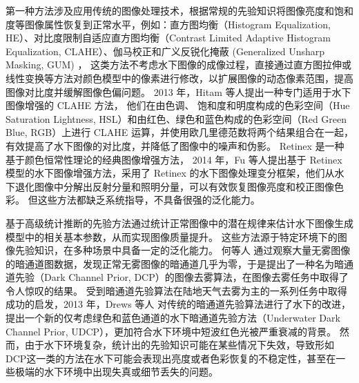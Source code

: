 第一种方法涉及应用传统的图像处理技术，根据常规的先验知识将图像亮度和饱和度等图像属性恢复到正常水平，例如：直方图均衡（Histogram Equalization, HE）\cite{he}、对比度限制自适应直方图均衡（Contrast Limited Adaptive Histogram Equalization, CLAHE）\cite{clahe}、伽马校正和广义反锐化掩蔽 (Generalized Unsharp Masking, GUM) \cite{gum}，
这类方法不考虑水下图像的成像过程，直接通过直方图拉伸或线性变换等方法对颜色模型中的像素进行修改，以扩展图像的动态像素范围，提高图像对比度并缓解图像色偏问题。
2013 年，Hitam 等人\cite{mixture_clahe}提出一种专门适用于水下图像增强的 CLAHE 方法， 他们在由色调、 饱和度和明度构成的色彩空间（Hue Saturation Lightness, HSL）和由红色、绿色和蓝色构成的色彩空间（Red Green Blue, RGB）上进行 CLAHE 运算，并使用欧几里德范数将两个结果组合在一起，有效提高了水下图像的对比度，并降低了图像中的噪声和伪影。
Retinex 是一种基于颜色恒常性理论的经典图像增强方法，
2014 年，Fu 等人\cite{uw_retinex}提出基于 Retinex 模型的水下图像增强方法，采用了 Retinex 的水下图像处理变分框架，他们从水下退化图像中分解出反射分量和照明分量，可以有效恢复图像亮度和校正图像色彩。
但这些方法都缺乏系统指导，不具备很强的泛化能力。

基于高级统计推断的先验方法通过统计正常图像中的潜在规律来估计水下图像生成模型中的相关基本参数，从而实现图像质量提升。
这些方法源于特定环境下的图像先验知识，在多种场景中具备一定的泛化能力。
何等人 \cite{dcp} 通过观察大量无雾图像的暗通道图数据，发现正常无雾图像的暗通道几乎为零，于是提出了一种名为暗通道先验（Dark Channel Prior, DCP）的图像去雾算法，在图像去雾任务中取得了令人惊叹的结果。
受到暗通道先验算法在陆地天气去雾为主的一系列任务中取得成功的启发，2013 年，Drews 等人 \cite{udcp}对传统的暗通道先验算法进行了水下的改进，提出一个新的仅考虑绿色和蓝色通道的水下暗通道先验方法（Underwater Dark Channel Prior, UDCP），更加符合水下环境中短波红色光被严重衰减的背景。
然而，由于水下环境复杂，统计出的先验知识可能在某些情况下失效，导致形如DCP这一类的方法在水下可能会表现出亮度或者色彩恢复的不稳定性，甚至在一些极端的水下环境中出现失真或细节丢失的问题。

